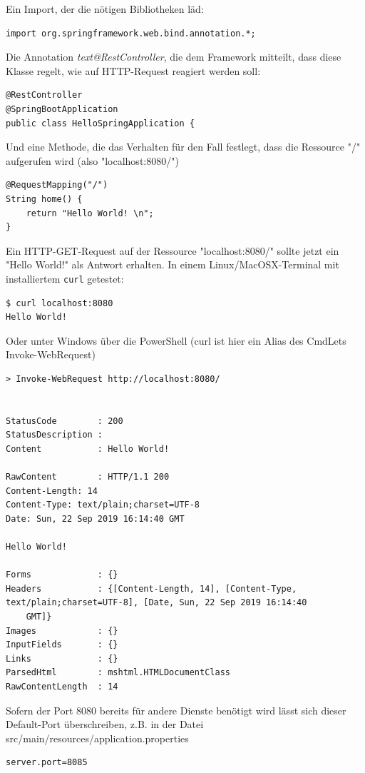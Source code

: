 \documentclass[10pt]{scrartcl}
\begin{document}
Ein Import, der die nötigen Bibliotheken läd:
\begin{lstlisting}[style=java] 
import org.springframework.web.bind.annotation.*;
\end{lstlisting}

Die Annotation \textit{text@RestController}, die dem Framework mitteilt, dass diese Klasse regelt, wie auf HTTP-Request reagiert werden soll:
\begin{lstlisting}[style=java] 
@RestController
@SpringBootApplication
public class HelloSpringApplication {
\end{lstlisting}

Und eine Methode, die das Verhalten für den Fall festlegt, dass die Ressource "/" aufgerufen wird (also "localhost:8080/")
\begin{lstlisting}[style=java] 
@RequestMapping("/")
String home() {
	return "Hello World! \n";
}
\end{lstlisting}


Ein HTTP-GET-Request auf der Ressource "localhost:8080/" sollte jetzt ein "Hello World!" als Antwort erhalten.
In einem Linux/MacOSX-Terminal mit installiertem \texttt{curl} getestet:
\begin{lstlisting}[language=bash] 
$ curl localhost:8080
Hello World!
\end{lstlisting}
Oder unter Windows über die PowerShell (curl ist hier ein Alias des CmdLets Invoke-WebRequest)
\begin{lstlisting}[style=powershell] 
> Invoke-WebRequest http://localhost:8080/


StatusCode        : 200
StatusDescription :
Content           : Hello World!

RawContent        : HTTP/1.1 200
Content-Length: 14
Content-Type: text/plain;charset=UTF-8
Date: Sun, 22 Sep 2019 16:14:40 GMT

Hello World!

Forms             : {}
Headers           : {[Content-Length, 14], [Content-Type, text/plain;charset=UTF-8], [Date, Sun, 22 Sep 2019 16:14:40
	GMT]}
Images            : {}
InputFields       : {}
Links             : {}
ParsedHtml        : mshtml.HTMLDocumentClass
RawContentLength  : 14
\end{lstlisting}

Sofern der Port 8080 bereits für andere Dienste benötigt wird lässt sich dieser Default-Port überschreiben, z.B. in der Datei src/main/resources/application.properties
\begin{lstlisting}[style=java] 
server.port=8085
\end{lstlisting}
\end{document}
